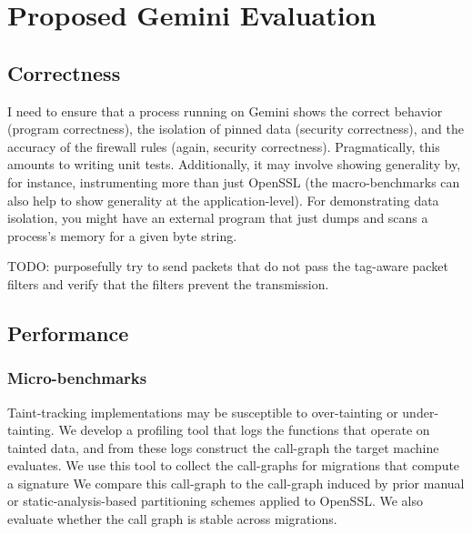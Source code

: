 \section{Proposed Gemini Evaluation}
\label{sec:gemini-eval}
%


\subsection{Correctness}
%
I need to ensure that a process running on Gemini shows the correct behavior
(program correctness), the isolation of pinned data (security correctness), and
the accuracy of the firewall rules (again, security correctness).
%
Pragmatically, this amounts to writing unit tests.
%
Additionally, it may involve showing generality by, for instance, instrumenting
more than just OpenSSL (the macro-benchmarks can also help to show generality
at the application-level).
%
For demonstrating data isolation, you might have an external program that just
dumps and scans a process's memory for a given byte string.




%
TODO: purposefully try to send packets that do not pass the tag-aware packet
filters and verify that the filters prevent the transmission.


\subsection{Performance}

\subsubsection{Micro-benchmarks}

%
Taint-tracking implementations may be susceptible to over-tainting or
under-tainting.
%
We develop a profiling tool that logs the functions that operate on
tainted data, and from these logs construct the call-graph the target machine
evaluates.
%
We use this tool to collect the call-graphs for migrations that compute a
signature
%
We compare this call-graph to the call-graph induced by prior manual or
static-analysis-based partitioning schemes applied to OpenSSL\@.
%
We also evaluate whether the call graph is stable across migrations.


